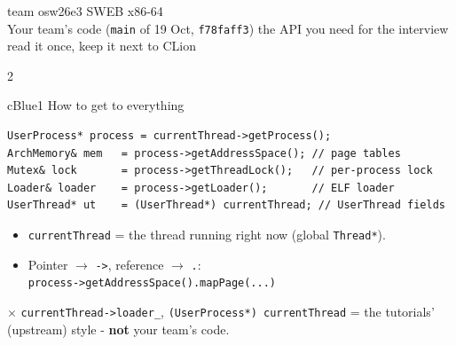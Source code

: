 \documentclass[10pt,a4paper,landscape]{article}
\newcommand{\cc}[1]{\texttt{#1}}   %
\newcommand{\no}{\textcolor{cRed}{\ensuremath{\times}}}
\begin{document}
\begin{tcolorbox}[enhanced, colback=cBlue, colframe=cBlue, arc=3mm, boxrule=0pt,
  interior style={left color=cBlue, right color=cPurple}, left=8pt, top=5pt, bottom=5pt]
  \color{white}{\LARGE\bfseries A0 Cheat Sheet}\hfill{\small team osw26e3 \textbullet{} SWEB x86-64}\\[2pt]
  {\small Your team's code (\texttt{main} of 19 Oct, \texttt{f78faff3}) \textbullet{} the API you need for the
  interview \textbullet{} read it once, keep it next to CLion}
\end{tcolorbox}

\begin{multicols}{2}

\begin{csec}{cBlue}{1 \quad How to get to everything}
\begin{lstlisting}
UserProcess* process = currentThread->getProcess();
ArchMemory& mem   = process->getAddressSpace(); // page tables
Mutex& lock       = process->getThreadLock();   // per-process lock
Loader& loader    = process->getLoader();       // ELF loader
UserThread* ut    = (UserThread*) currentThread; // UserThread fields
\end{lstlisting}
\begin{itemize}
  \item \cc{currentThread} = the thread running right now (global \cc{Thread*}).
  \item Pointer $\to$ \cc{->}, reference $\to$ \cc{.}:\\
        \cc{process->getAddressSpace().mapPage(...)}
\end{itemize}
\begin{tip}[cRed]
  \no{} \cc{currentThread->loader\_}, \cc{(UserProcess*) currentThread} = the tutorials' (upstream) style - \textbf{not} your team's code.
\end{tip}
\end{csec}


\end{multicols}
\end{document}

